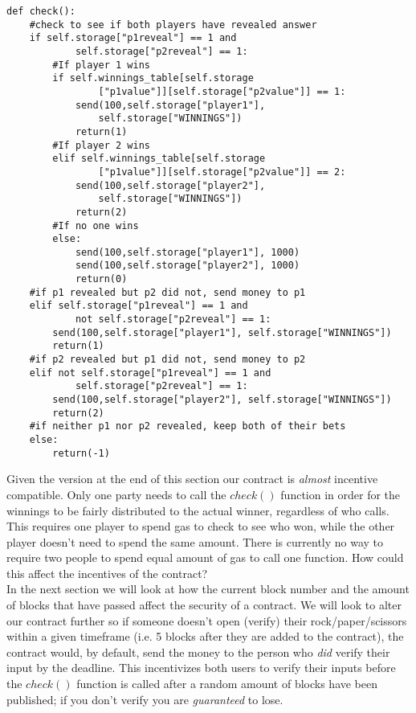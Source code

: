 \documentclass[12pt]{article}
\begin{document}
\begin{lstlisting}[frame=single]
def check():
	#check to see if both players have revealed answer
	if self.storage["p1reveal"] == 1 and 
			self.storage["p2reveal"] == 1:
		#If player 1 wins
		if self.winnings_table[self.storage
				["p1value"]][self.storage["p2value"]] == 1:
			send(100,self.storage["player1"], 
				self.storage["WINNINGS"])
			return(1)
		#If player 2 wins
		elif self.winnings_table[self.storage
				["p1value"]][self.storage["p2value"]] == 2:
			send(100,self.storage["player2"], 
				self.storage["WINNINGS"])
			return(2)
		#If no one wins
		else:
			send(100,self.storage["player1"], 1000)
			send(100,self.storage["player2"], 1000)
			return(0)
	#if p1 revealed but p2 did not, send money to p1
	elif self.storage["p1reveal"] == 1 and 
			not self.storage["p2reveal"] == 1:
		send(100,self.storage["player1"], self.storage["WINNINGS"])
		return(1)
	#if p2 revealed but p1 did not, send money to p2
	elif not self.storage["p1reveal"] == 1 and 
			self.storage["p2reveal"] == 1:
		send(100,self.storage["player2"], self.storage["WINNINGS"])
		return(2)
	#if neither p1 nor p2 revealed, keep both of their bets
	else:
		return(-1)
\end{lstlisting}

Given the version at the end of this section our contract is \textit{almost} incentive compatible. Only one party needs to call the $check()$ function in order for the winnings to be fairly distributed to the actual winner, regardless of who calls. This requires one player to spend gas to check to see who won, while the other player doesn't need to spend the same amount. There is currently no way to require two people to spend equal amount of gas to call one function. How could this affect the incentives of the contract? \\

In the next section we will look at how the current block number and the amount of blocks that have passed affect the security of a contract. We will look to alter our contract further so if someone doesn't open (verify) their rock/paper/scissors within a given timeframe (i.e. 5 blocks after they are added to the contract), the contract would, by default, send the money to the person who \textit{did} verify their input by the deadline. This incentivizes both users to verify their inputs before the $check()$ function is called after a random amount of blocks have been published; if you don't verify you are \textit{guaranteed} to lose.

\end{document}
